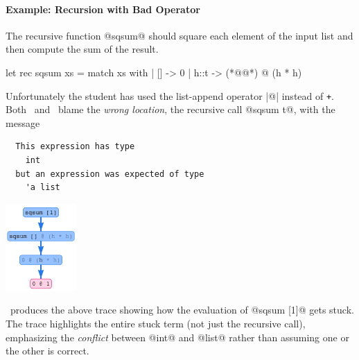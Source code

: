 \paragraph{Example: Recursion with Bad Operator}
The recursive function @sqsum@ should square each
element of the input list and then compute the sum
of the result.
%
\begin{ecode}
  let rec sqsum xs = match xs with
    | [] -> 0
    | h::t -> (*@@*) @ (h * h)
\end{ecode}
%
Unfortunately the student has used the list-append
operator |@| instead of \texttt{+}. %
%
Both \ocaml\ and \sherrloc\ blame the \emph{wrong location},
the recursive call @sqsum t@, with the message
%
\begin{verbatim}
  This expression has type
    int
  but an expression was expected of type
    'a list
\end{verbatim}
%
\begin{center}
  \includegraphics[height=125px]{sqsum.png}
\end{center}
%
\toolname\ produces the above trace showing how the evaluation of
@sqsum [1]@ gets stuck.
%
The trace highlights the entire stuck term
(not just the recursive call), emphasizing
the \emph{conflict} between @int@ and @list@
rather than assuming one or the other is correct.

